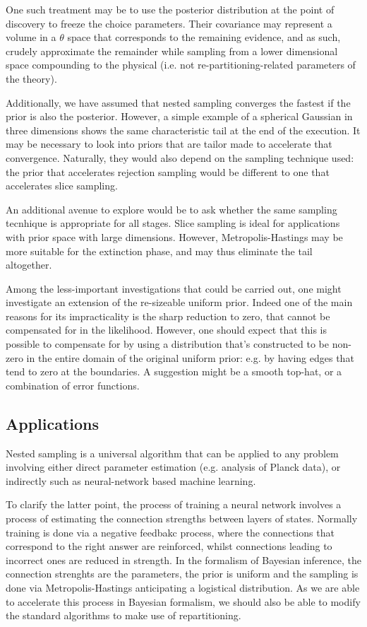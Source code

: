 \documentclass[usenatbib]{mnras}
\begin{document}
One such treatment may be to use the posterior distribution at the
point of discovery to freeze the choice parameters. Their
covariance may represent a volume in a \(\theta\) space that
corresponds to the remaining evidence, and as such, crudely
approximate the remainder while sampling from a lower dimensional
space compounding to the physical (i.e. not re-partitioning-related
parameters of the theory).

Additionally, we have assumed that nested sampling converges the
fastest if the prior is also the posterior. However, a simple
example of a spherical Gaussian in three dimensions shows the same
characteristic tail at the end of the execution. It may be
necessary to look into priors that are tailor made to accelerate
that convergence. Naturally, they would also depend on the sampling
technique used: the prior that accelerates rejection sampling would
be different to one that accelerates slice sampling.

An additional avenue to explore would be to ask whether the same
sampling tecnhique is appropriate for all stages. Slice sampling is
ideal for applications with prior space with large
dimensions. However, Metropolis-Hastings may be more suitable for
the extinction phase, and may thus eliminate the tail altogether.

Among the less-important investigations that could be carried out,
one might investigate an extension of the re-sizeable uniform
prior. Indeed one of the main reasons for its impracticality is the
sharp reduction to zero, that cannot be compensated for in the
likelihood. However, one should expect that this is possible to
compensate for by using a distribution that's constructed to be
non-zero in the entire domain of the original uniform prior:
e.g. by having edges that tend to zero at the boundaries. A
suggestion might be a smooth top-hat, or a combination of error
functions.

\subsection{Applications}
\label{sec:orgafc90f6}
Nested sampling is a universal algorithm that can be applied to any
problem involving either direct parameter estimation (e.g. analysis
of Planck data), or indirectly such as neural-network based machine
learning.

To clarify the latter point, the process of training a neural
network involves a process of estimating the connection strengths
between layers of states. Normally training is done via a negative
feedbakc process, where the connections that correspond to the
right answer are reinforced, whilst connections leading to
incorrect ones are reduced in strength. In the formalism of
Bayesian inference, the connection strenghts are the parameters,
the prior is uniform and the sampling is done via
Metropolis-Hastings anticipating a logistical distribution. As we
are able to accelerate this process in Bayesian formalism, we
should also be able to modify the standard algorithms to make use
of repartitioning.
\end{document}
